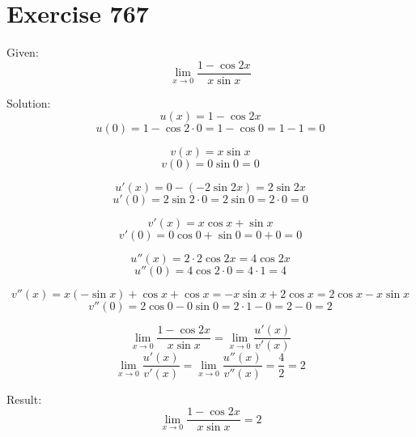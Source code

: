 \documentclass[a4paper, 10pt]{scrartcl}
\begin{document}
\section{Exercise 767}

Given:
\[\lim_{x\to 0}{\frac{1 - \cos{2x}}{x\sin{x}}}\]

Solution:
\[u(x) = 1 - \cos{2x}\]
\[u(0) = 1 - \cos{2\cdot 0} = 1 - \cos{0} = 1 - 1 = 0\]

\[v(x) = x\sin{x}\]
\[v(0) = 0\sin{0} = 0\]

\[u'(x) = 0 - (-2\sin{2x}) = 2\sin{2x}\]
\[u'(0) = 2\sin{2\cdot 0} = 2\sin{0} = 2\cdot 0 = 0\]

\[v'(x) = x\cos{x} + \sin{x}\]
\[v'(0) = 0\cos{0} + \sin{0} = 0 + 0 = 0\]

\[u''(x) = 2\cdot 2\cos{2x} = 4\cos{2x}\]
\[u''(0) = 4\cos{2\cdot 0} = 4\cdot 1 = 4\]

\[v''(x) = x(-\sin{x}) + \cos{x} + \cos{x} = -x\sin{x} + 2\cos{x} = 2\cos{x} - x\sin{x}\]
\[v''(0) = 2\cos{0} - 0\sin{0} = 2\cdot 1 - 0 = 2 - 0 = 2\]

\[\lim_{x\to 0}{\frac{1 - \cos{2x}}{x\sin{x}}} = \lim_{x\to 0}{\frac{u'(x)}{v'(x)}}\]
\[\lim_{x\to 0}{\frac{u'(x)}{v'(x)}} = \lim_{x\to 0}{\frac{u''(x)}{v''(x)}} =
\frac{4}{2} = 2\]

Result:
\[\lim_{x\to 0}{\frac{1 - \cos{2x}}{x\sin{x}}} = 2\]
\end{document}
